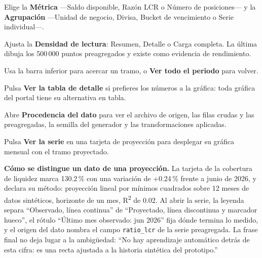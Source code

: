 
\begin{uxpreg}
  \item Elige la \textbf{Métrica} ---Saldo disponible, Razón LCR o Número de posiciones--- y la
    \textbf{Agrupación} ---Unidad de negocio, Divisa, Bucket de vencimiento o Serie individual---.
  \item Ajusta la \textbf{Densidad de lectura}: Resumen, Detalle o Carga completa. La última dibuja
    los 500\,000 puntos preagregados y existe como evidencia de rendimiento.
  \item Usa la barra inferior para acercar un tramo, o \textbf{Ver todo el periodo} para volver.
  \item Pulsa \textbf{Ver la tabla de detalle} si prefieres los números a la gráfica: toda gráfica
    del portal tiene su alternativa en tabla.
  \item Abre \textbf{Procedencia del dato} para ver el archivo de origen, las filas crudas y las
    preagregadas, la semilla del generador y las transformaciones aplicadas.
  \item Pulsa \textbf{Ver la serie} en una tarjeta de proyección para desplegar su gráfica mensual
    con el tramo proyectado.
\end{uxpreg}

\begin{uxdestacado}
\textbf{Cómo se distingue un dato de una proyección.} La tarjeta de la cobertura de liquidez marca
130.2\,\% con una variación de +0.24\,\% frente a junio de 2026, y declara su método: proyección
lineal por mínimos cuadrados sobre 12 meses de datos sintéticos, horizonte de un mes,
R\textsuperscript{2} de 0.02. Al abrir la serie, la leyenda separa \enquote{Observado, línea
continua} de \enquote{Proyectado, línea discontinua y marcador hueco}, el rótulo
\enquote{Último mes observado: jun 2026} fija dónde termina lo medido, y el origen del dato nombra
el campo \texttt{ratio\_lcr} de la serie preagregada. La frase final no deja lugar a la
ambigüedad: \enquote{No hay aprendizaje automático detrás de esta cifra: es una recta ajustada a
la historia sintética del prototipo.}
\end{uxdestacado}

